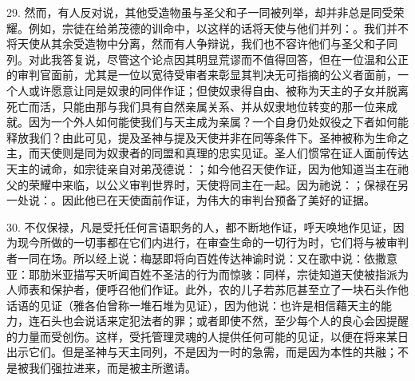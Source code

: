29. 然而，有人反对说，其他受造物虽与圣父和子一同被列举，却并非总是同受荣耀。例如，宗徒在给弟茂德的训命中，以这样的话将天使与他们并列：。我们并不将天使从其余受造物中分离，然而有人争辩说，我们也不容许他们与圣父和子同列。对此我答复说，尽管这个论点因其明显荒谬而不值得回答，但在一位温和公正的审判官面前，尤其是一位以宽待受审者来彰显其判决无可指摘的公义者面前，一个人或许愿意让同是奴隶的同伴作证；但使奴隶得自由、被称为天主的子女并脱离死亡而活，只能由那与我们具有自然亲属关系、并从奴隶地位转变的那一位来成就。因为一个外人如何能使我们与天主成为亲属？一个自身仍处奴役之下者如何能释放我们？由此可见，提及圣神与提及天使并非在同等条件下。圣神被称为生命之主，而天使则是同为奴隶者的同盟和真理的忠实见证。圣人们惯常在证人面前传达天主的诫命，如宗徒亲自对弟茂德说：；如今他召天使作证，因为他知道当主在祂父的荣耀中来临，以公义审判世界时，天使将同主在一起。因为祂说：；保禄在另一处说：。因此他已在天使面前作证，为伟大的审判台预备了美好的证据。\par

30. 不仅保禄，凡是受托任何言语职务的人，都不断地作证，呼天唤地作见证，因为现今所做的一切事都在它们内进行，在审查生命的一切行为时，它们将与被审判者一同在场。所以经上说：梅瑟即将向百姓传达神谕时说：又在歌中说：依撒意亚：耶肋米亚描写天听闻百姓不圣洁的行为而惊骇：同样，宗徒知道天使被指派为人师表和保护者，便呼召他们作证。此外，农的儿子若苏厄甚至立了一块石头作他话语的见证（雅各伯曾称一堆石堆为见证），因为他说：也许是相信藉天主的能力，连石头也会说话来定犯法者的罪；或者即使不然，至少每个人的良心会因提醒的力量而受创伤。这样，受托管理灵魂的人提供任何可能的见证，以便在将来某日出示它们。但是圣神与天主同列，不是因为一时的急需，而是因为本性的共融；不是被我们强拉进来，而是被主所邀请。\par


